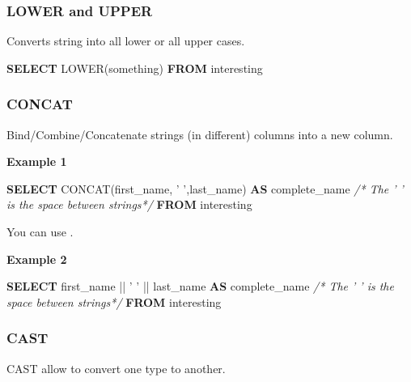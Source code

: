 \documentclass[]{book}
\newenvironment{Shaded}{\begin{snugshade}}{\end{snugshade}}
\newcommand{\KeywordTok}[1]{\textcolor[rgb]{0.13,0.29,0.53}{\textbf{#1}}}
\newcommand{\StringTok}[1]{\textcolor[rgb]{0.31,0.60,0.02}{#1}}
\newcommand{\CommentTok}[1]{\textcolor[rgb]{0.56,0.35,0.01}{\textit{#1}}}
\newcommand{\FunctionTok}[1]{\textcolor[rgb]{0.00,0.00,0.00}{#1}}
\newcommand{\NormalTok}[1]{#1}
\begin{document}
\subsubsection{LOWER and UPPER}\label{lower-and-upper}

Converts string into all lower or all upper cases.

\begin{Shaded}
\begin{Highlighting}[]
\KeywordTok{SELECT} \FunctionTok{LOWER}\NormalTok{(something)}
\KeywordTok{FROM}\NormalTok{ interesting}
\end{Highlighting}
\end{Shaded}

\subsubsection{CONCAT}\label{concat}

Bind/Combine/Concatenate strings (in different) columns into a new
column.

\textbf{Example 1}

\begin{Shaded}
\begin{Highlighting}[]
\KeywordTok{SELECT} \FunctionTok{CONCAT}\NormalTok{(first_name, }\StringTok{' '}\NormalTok{,last_name) }\KeywordTok{AS}\NormalTok{ complete_name }\CommentTok{/* The ' ' is the space between strings*/}
\KeywordTok{FROM}\NormalTok{ interesting}
\end{Highlighting}
\end{Shaded}

You can use \textbar{}\textbar{}.

\textbf{Example 2}

\begin{Shaded}
\begin{Highlighting}[]
\KeywordTok{SELECT}\NormalTok{ first_name || }\StringTok{' '}\NormalTok{ || last_name }\KeywordTok{AS}\NormalTok{ complete_name }\CommentTok{/* The ' ' is the space between strings*/}
\KeywordTok{FROM}\NormalTok{ interesting}
\end{Highlighting}
\end{Shaded}

\subsubsection{CAST}\label{cast}

CAST allow to convert one type to another.
\end{document}
